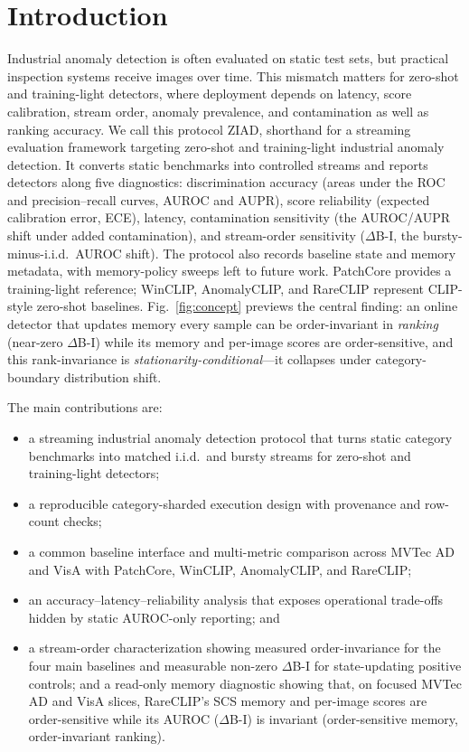 \documentclass[runningheads]{llncs}
\newcommand{\figref}[1]{Fig.~\ref{#1}}
\begin{document}
\section{Introduction}
Industrial anomaly detection is often evaluated on static test sets, but
practical inspection systems receive images over time. This mismatch matters
for zero-shot and training-light detectors, where deployment depends on
latency, score calibration, stream order, anomaly prevalence, and
contamination as well as ranking accuracy. We call this protocol ZIAD,
shorthand for a streaming evaluation framework targeting zero-shot and
training-light industrial anomaly detection. It converts static benchmarks
into controlled streams and reports detectors along five diagnostics:
discrimination accuracy (areas under the ROC and precision--recall curves,
AUROC and AUPR), score reliability (expected calibration error, ECE), latency,
contamination sensitivity (the AUROC/AUPR shift under added contamination), and stream-order sensitivity
($\Delta$B-I, the bursty-minus-i.i.d.\ AUROC shift). The protocol also records
baseline state and memory metadata, with memory-policy sweeps left to future
work. PatchCore provides a training-light reference; WinCLIP,
AnomalyCLIP, and RareCLIP represent CLIP-style zero-shot baselines.
\figref{fig:concept} previews the central finding: an online detector that
updates memory every sample can be order-invariant in \emph{ranking} (near-zero
$\Delta$B-I) while its memory and per-image scores are order-sensitive, and this
rank-invariance is \emph{stationarity-conditional}---it collapses under
category-boundary distribution shift.

The main contributions are:
\begin{itemize}
\item a streaming industrial anomaly detection protocol that turns static
category benchmarks into matched i.i.d.\ and bursty streams for zero-shot and
training-light detectors;
\item a reproducible category-sharded execution design with provenance and
row-count checks;
\item a common baseline interface and multi-metric comparison across MVTec AD
and VisA with PatchCore, WinCLIP, AnomalyCLIP, and RareCLIP;
\item an accuracy--latency--reliability analysis that exposes operational
trade-offs hidden by static AUROC-only reporting; and
\item a stream-order characterization showing measured order-invariance for the
four main baselines and measurable non-zero $\Delta$B-I for state-updating
positive controls; and a read-only memory diagnostic showing that, on focused
MVTec AD and VisA slices, RareCLIP's SCS memory and per-image scores are order-sensitive
while its AUROC ($\Delta$B-I) is invariant (order-sensitive memory,
order-invariant ranking).
\end{itemize}
\end{document}
